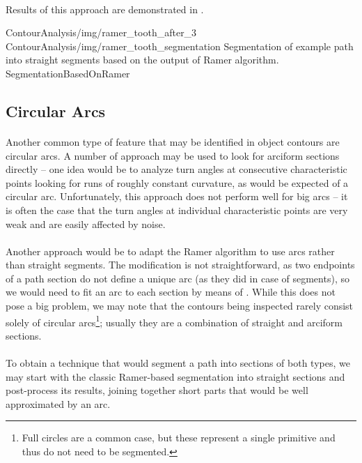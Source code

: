 \paragraph*{}
Results of this approach are demonstrated in .

\twoFigures
{ContourAnalysis/img/ramer_tooth_after_3}
{ContourAnalysis/img/ramer_tooth_segmentation}
{Segmentation of example path into straight segments based on the output of Ramer algorithm.}
{SegmentationBasedOnRamer}
{\basicWidth}

\subsection{Circular Arcs}

\paragraph*{}
Another common type of feature that may be identified in object contours are circular arcs. A number of approach may be used to look for arciform sections directly -- one idea would be to analyze turn angles at consecutive characteristic points looking for runs of roughly constant curvature, as would be expected of a circular arc. Unfortunately, this approach does not perform well for big arcs -- it is often the case that the turn angles at individual characteristic points are very weak and are easily affected by noise.

\paragraph*{}
Another approach would be to adapt the Ramer algorithm to use arcs rather than straight segments. The modification is not straightforward, as two endpoints of a path section do not define a unique arc (as they did in case of segments), so we would need to fit an arc to each section by means of . While this does not pose a big problem, we may note that the contours being inspected rarely consist solely of circular arcs\footnote{Full circles are a common case, but these represent a single primitive and thus do not need to be segmented.}; usually they are a combination of straight and arciform sections.

\paragraph*{}
To obtain a technique that would segment a path into sections of both types, we may start with the classic Ramer-based segmentation into straight sections and post-process its results, joining together short parts that would be well approximated by an arc.

